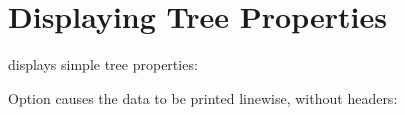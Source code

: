\section[sct_stats]{Displaying Tree Properties}

\stats{} displays simple tree properties:

\noindent{}Option  causes the data to be printed linewise, without
headers:

